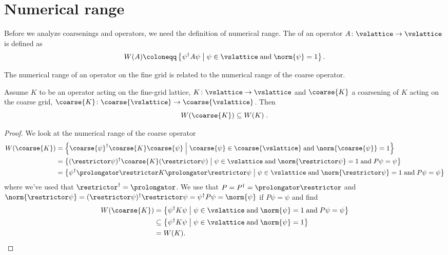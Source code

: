 \section{Numerical range}

Before we analyze coarsenings and operators, we need the definition of numerical range.
The  of an operator $A \colon \vslattice \rightarrow \vslattice$ is defined as
\begin{align} \label{eq:def:numerical:range}
W(A) \coloneqq \left\{ \psi^\dagger A \psi \; \middle| \; \psi \in \vslattice \; \text{and} \; \norm{\psi} = 1 \right\}.
\end{align}

The numerical range of an operator on the fine grid is related to the numerical range of the coarse operator.

\begin{theorem} \label{thm:numerical:range}
Assume $K$ to be an operator acting on the fine-grid lattice, $K \colon \vslattice \rightarrow \vslattice$ and $\coarse{K}$ a coarsening of $K$ acting on the coarse grid, $\coarse{K} \colon \coarse{\vslattice} \rightarrow \coarse{\vslattice}$.
Then
\begin{equation}
W(\coarse{K}) \subseteq W(K) \;.
\end{equation}
\end{theorem}

\begin{proof}
We look at the numerical range of the coarse operator
\begin{align*}
W({\coarse{K}})
&= \left\{ \coarse{\psi}^\dagger \coarse{K} \coarse{\psi} \; \middle| \; \coarse{\psi} \in \coarse{\vslattice} \; \text{and} \; \norm{\coarse{\psi}} = 1 \right\} \\
&= \left\{ (\restrictor \psi)^\dagger \coarse{K} (\restrictor \psi) \; \middle| \; \psi \in \vslattice \; \text{and} \; \norm{\restrictor \psi} = 1 \; \text{and} \; P \psi = \psi \right\} \\
&= \left\{ \psi^\dagger \prolongator \restrictor K \prolongator \restrictor \psi \; \middle| \; \psi \in \vslattice \; \text{and} \; \norm{\restrictor \psi} = 1 \; \text{and} \; P \psi = \psi \right\}
\end{align*}
where we've used that $\restrictor^\dagger = \prolongator$. We use that $P = P^\dagger = \prolongator \restrictor$ and $\norm{\restrictor \psi} = (\restrictor \psi)^\dagger \restrictor \psi = \psi^\dagger P \psi = \norm{\psi}$ if $P \psi = \psi$ and find
\begin{align*}
W({\coarse{K}})
&= \left\{ \psi^\dagger K \psi \; \middle| \; \psi \in \vslattice \; \text{and} \; \norm{\psi} = 1 \; \text{and} \; P \psi = \psi \right\} \\
&\subseteq \left\{ \psi^\dagger K \psi \; \middle| \; \psi \in \vslattice \; \text{and} \; \norm{\psi} = 1 \right\} \\
&= W({K}).
\end{align*}
\end{proof}

